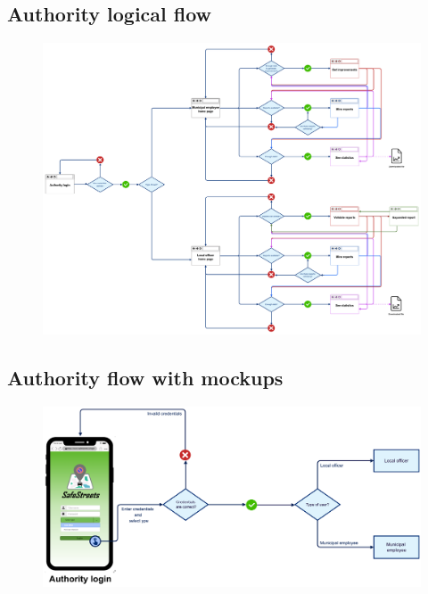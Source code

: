 			\subsection{Authority logical flow}
			\begin{figure}[!h]
				\centering
				\includegraphics[width=\textwidth]{images/Flow/AuthoritySimpleFlow}
			\end{figure}
			\subsection{Authority flow with mockups}
			\begin{figure}[!h]
				\centering
				\includegraphics[width=\textwidth]{images/Flow/AuthorityFlow}
			\end{figure}
			\clearpage
